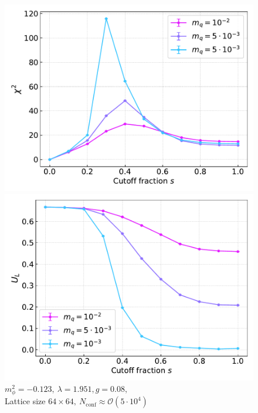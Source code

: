 \begin{figure}[h!]
\begin{minipage}{0.45\textwidth}
\end{minipage}
\begin{minipage}{0.45\textwidth}	
	\includegraphics[scale=0.48]{figures/chiral_PT/chi2.pdf}
\end{minipage}
\hfill
\begin{minipage}{0.45\textwidth}
	\includegraphics[scale=0.48]{figures/chiral_PT/binder.pdf}
\end{minipage}
\hfill
\caption{$m_\phi^2=-0.123, \ \lambda=1.951, g=0.08,$ \\ Lattice size $64 \times 64, \ N_\text{conf} \approx \mathcal{O}(5 \cdot 10^4)$}
\label{fig:chiral:symmetry_breaking}
\end{figure}\\

